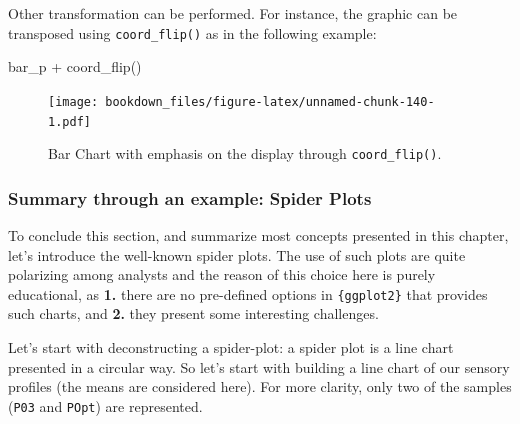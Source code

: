 \documentclass[
]{krantz}
\makeatletter
\newenvironment{Shaded}{\begin{snugshade}}{\end{snugshade}}
\newcommand{\FunctionTok}[1]{\textcolor[rgb]{0,0,0}{#1}}
\newcommand{\NormalTok}[1]{#1}
\newcommand{\SpecialCharTok}[1]{\textcolor[rgb]{0,0,0}{#1}}
\newenvironment{kframe}{%
\medskip{}
\setlength{\fboxsep}{.8em}
 \def\at@end@of@kframe{}%
 \ifinner\ifhmode%
  \def\at@end@of@kframe{\end{minipage}}%
  \begin{minipage}{\columnwidth}%
 \fi\fi%
 \def\FrameCommand##1{\hskip\@totalleftmargin \hskip-\fboxsep
 \colorbox{shadecolor}{##1}\hskip-\fboxsep
     \hskip-\linewidth \hskip-\@totalleftmargin \hskip\columnwidth}%
 \MakeFramed {\advance\hsize-\width
   \@totalleftmargin\z@ \linewidth\hsize
   \@setminipage}}%
 {\par\unskip\endMakeFramed%
 \at@end@of@kframe}
\renewenvironment{Shaded}{\begin{kframe}}{\end{kframe}}
\makeatother
\begin{document}
Other transformation can be performed. For instance, the graphic can be transposed using \texttt{coord\_flip()} as in the following example:

\begin{Shaded}
\begin{Highlighting}[]
\NormalTok{bar\_p }\SpecialCharTok{+} \FunctionTok{coord\_flip}\NormalTok{()}
\end{Highlighting}
\end{Shaded}

\begin{figure}
\centering
\texttt{[image: bookdown\_files/figure-latex/unnamed-chunk-140-1.pdf]}
\caption{\label{fig:unnamed-chunk-140}Bar Chart with emphasis on the display through \texttt{coord\_flip()}.}
\end{figure}

\hypertarget{spider}{%
\subsubsection*{Summary through an example: Spider Plots}\label{spider}}


To conclude this section, and summarize most concepts presented in this chapter, let's introduce the well-known spider plots. The use of such plots are quite polarizing among analysts and the reason of this choice here is purely educational, as \textbf{1.} there are no pre-defined options in \texttt{\{ggplot2\}} that provides such charts, and \textbf{2.} they present some interesting challenges.

Let's start with deconstructing a spider-plot: a spider plot is a line chart presented in a circular way. So let's start with building a line chart of our sensory profiles (the means are considered here). For more clarity, only two of the samples (\texttt{P03} and \texttt{POpt}) are represented.
\end{document}

